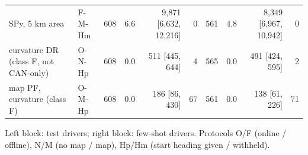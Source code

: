\begin{table}[t]
\begin{tabular}{llrrrrrrrr}
SPy, 5 km area & F-M-Hm & 608 & 6.6 & 9{,}871 [6{,}632, 12{,}216] & 0 & 561 & 4.8 & 8{,}349 [6{,}967, 10{,}942] & 0 \\
curvature DR (class F, not CAN-only) & O-N-Hp & 608 & 0.0 & 511 [445, 644] & 4 & 565 & 0.0 & 491 [424, 595] & 2 \\
map PF, curvature (class F) & O-M-Hp & 608 & 0.0 & 186 [86, 430] & 67 & 561 & 0.0 & 138 [61, 226] & 71 \\
\bottomrule\end{tabular}
\par\smallskip\raggedright Left block: test drivers; right block: few-shot drivers. Protocols O/F (online / offline), N/M (no map / map), Hp/Hm (start heading given / withheld).
\end{table}
